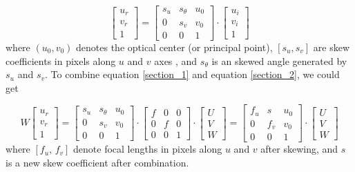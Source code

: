 \begin{equation}
%
\left[ \begin{array}{c} u_r \\ v_r \\ 1 \end{array} \right] %
=  \begin{bmatrix} s_u & s_\theta & u_0 \\ 0 & s_v & v_0 \\ 0 & 0 & 1 \end{bmatrix} \cdot %
\left[ \begin{array}{c} u_i \\ v_i \\ 1 \end{array} \right]%
\label{section_2}
\end{equation}%
where \((u_0, v_0)\) denotes the optical center (or principal point), \([s_u, s_v]\) are skew coefficients in pixels along \(u\) and  \(v\) axes , and  \(s_\theta\) is an skewed angle generated by \(s_u\) and  \(s_v\). To combine equation \ref{section_1} and equation \ref{section_2}, we could get %

\begin{equation}
%
W \left[ \begin{array}{c} u_r \\ v_r \\ 1 \end{array} \right] %
=  \begin{bmatrix} s_u & s_\theta & u_0 \\ 0 & s_v & v_0 \\ 0 & 0 & 1 \end{bmatrix} \cdot%
 \begin{bmatrix} f & 0 & 0 \\ 0 & f & 0 \\ 0 & 0 & 1 \end{bmatrix} \cdot %
\left[ \begin{array}{c} U \\ V \\ W \end{array} \right]%
=  \begin{bmatrix} f_u & s & u_0 \\ 0 & f_v & v_0 \\ 0 & 0 & 1 \end{bmatrix} \cdot%
\left[ \begin{array}{c} U \\ V \\ W \end{array} \right]%
%
\end{equation}%
%
where \([f_u,\, f_v]\) denote focal lengths in pixels along \(u\) and \(v\) after skewing, and \(s\) is a new skew coefficient after combination.

